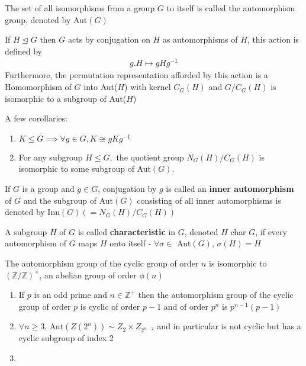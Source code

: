 \documentclass[titlepage, 12pt]{book}
\begin{document}
\begin{definition}{}{}
    The set of all isomorphisms from a group $G$ to itself is called the
    automorphism group, denoted by Aut$(G)$
\end{definition}

\begin{proposition}{}{}
    If $H\trianglelefteq G$ then $G$ acts by conjugation on $H$ as automorphisms
    of $H$, this action is defined by
    \begin{gather*}
        g.H\mapsto gHg^{-1}
    \end{gather*}
    Furthermore, the permutation representation afforded by this action is a
    Homomorphism of $G$ into Aut($H$) with kernel $C_G(H)$ and $G/C_G(H)$ is
    isomorphic to a subgroup of Aut($H$)
\end{proposition}
A few corollaries:
\begin{enumerate}
    \item $K\leq G\implies\forall g\in G, K\cong gKg^{-1}$
    \item For any subgroup $H\leq G,$ the quotient group $N_G(H)/C_G(H)$ is
        isomorphic to some subgroup of Aut$(G)$.
\end{enumerate}

\begin{definition}{}{}
    If $G$ is a group and $g\in G$, conjugation by $g$ is called an
    \textbf{inner automorphism} of $G$ and the subgroup of Aut$(G)$ consisting
    of all inner automorphisms is denoted by Inn$(G) (= N_G(H)/C_G(H))$
\end{definition}


\begin{definition}{}{}
    A subgroup $H$ of $G$ is called \textbf{characteristic} in $G$, denoted $H$
    char $G$, if every automorphism of $G$ maps $H$ onto itself -
    $\forall\sigma\in$ Aut$(G)$, $\sigma(H) = H$
\end{definition}

\begin{proposition}{}{}
    The automorphism group of the cyclic group of order $n$ is isomorphic to
    $(\mathbb{Z}/\mathbb{Z})^\times$, an abelian group of order $\phi(n)$
\end{proposition}

\begin{proposition}{}{}
    \begin{enumerate}
        \item If $p$ is an odd prime and $n\in\mathbb{Z}^+$ then the
            automorphism group of the cyclic group of order $p$ is cyclic of
            order $p-1$ and of order $p^n$ is $p^{n-1}(p-1)$
        \item $\forall n\geq 3$, Aut$(Z(2^n))\sim Z_2\times Z_{2^{n-2}}$ and in
            particular is not cyclic but has a cyclic subgroup of index 2
        \item 
    \end{enumerate}
\end{proposition}
\end{document}
